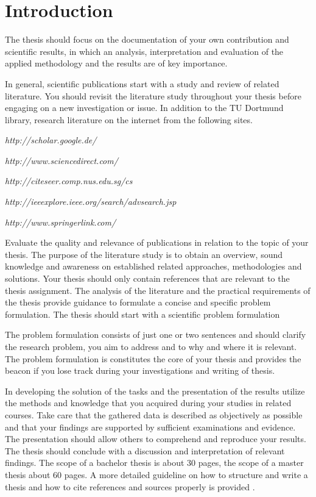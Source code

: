 \chapter{Introduction}
\label{aufbau}

The thesis should focus on the documentation of your own contribution and scientific results, in which an analysis, interpretation and evaluation of the applied methodology and the results are of key importance.

In general, scientific publications start with a study and review of related literature.
You should revisit the literature study throughout your thesis before engaging on a new
investigation or issue.
In addition to the TU Dortmund library, research literature on the internet from the following sites.

\emph{http://scholar.google.de/}

\emph{http://www.sciencedirect.com/}

\emph{http://citeseer.comp.nus.edu.sg/cs}

\emph{http://ieeexplore.ieee.org/search/advsearch.jsp}

\emph{http://www.springerlink.com/}

Evaluate the quality and relevance of publications in relation to the topic of your
thesis.
The purpose of the literature study is to obtain an overview, sound knowledge and awareness on established related approaches, methodologies and solutions. 
Your thesis should only contain references that are relevant to the thesis assignment.
The analysis of the literature and the practical requirements of the thesis provide 
guidance to formulate a concise and specific problem formulation.
The thesis should start with a scientific problem formulation

The problem formulation consists of just one or two sentences and should clarify the research problem, you aim to address and to why and where it is relevant. The problem formulation is constitutes the core of your thesis and provides the beacon if you lose track during your investigations and writing of thesis.

In developing the solution of the tasks and the presentation of the results utilize the methods and knowledge that you acquired during your studies in related courses.
Take care that the gathered data is described as objectively as possible and that your findings are supported by sufficient examinations and evidence.
The presentation should allow others to comprehend and reproduce your results.
The thesis should conclude with a discussion and interpretation of relevant findings.
The scope of a bachelor thesis is about 30 pages, the scope of a master thesis about 60 pages.
A more detailed guideline on how to structure and write a thesis and how to cite references and sources properly is provided \textcite{Leit1}.

